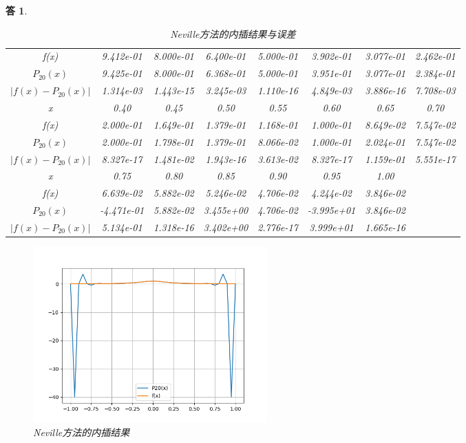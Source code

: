 \documentclass[10pt]{ctexart}
\newtheorem*{answer}{答}
\begin{document}
\begin{answer}
\begin{table}[H]
\begin{tabular}{cccccccc}
            \midrule
            f(x) &  9.412e-01 & 8.000e-01  & 6.400e-01 & 5.000e-01 & 3.902e-01 & 3.077e-01 & 2.462e-01 \\
            $P_{20}(x)$ &  9.425e-01 & 8.000e-01& 6.368e-01 & 5.000e-01 & 3.951e-01 & 3.077e-01 & 2.384e-01 \\
            $\lvert f(x)-P_{20}(x)\rvert$ & 1.314e-03 & 1.443e-15& 3.245e-03 & 1.110e-16 & 4.849e-03 & 3.886e-16 &  7.708e-03\\
            \bottomrule
            \toprule
            x & 0.40 & 0.45 & 0.50 & 0.55 & 0.60 & 0.65 & 0.70 \\
            \midrule
            f(x) &  2.000e-01 & 1.649e-01  & 1.379e-01& 1.168e-01  &  1.000e-01 &8.649e-02 &7.547e-02\\
            $P_{20}(x)$ &  2.000e-01 & 1.798e-01 & 1.379e-01 & 8.066e-02& 1.000e-01 & 2.024e-01& 7.547e-02 \\
            $\lvert f(x)-P_{20}(x)\rvert$ & 8.327e-17& 1.481e-02& 1.943e-16 & 3.613e-02& 8.327e-17 & 1.159e-01 & 5.551e-17\\
            \bottomrule
            \toprule
            x & 0.75 & 0.80 & 0.85 & 0.90 & 0.95 & 1.00\\
            \midrule
            f(x) &  6.639e-02 & 5.882e-02  & 5.246e-02&  4.706e-02  &  4.244e-02 &3.846e-02&\\
            $P_{20}(x)$ &  -4.471e-01 & 5.882e-02 & 3.455e+00&4.706e-02& -3.995e+01 & 3.846e-02 &\\
            $\lvert f(x)-P_{20}(x)\rvert$ & 5.134e-01&  1.318e-16& 3.402e+00 & 2.776e-17& 3.999e+01 & 1.665e-16&\\
            \bottomrule
        \end{tabular}
        \caption{Neville方法的内插结果与误差}
    \end{table}
    \begin{figure}[H]
        \centering
        \includegraphics[width=9cm]{Neville.png}
        \caption{Neville方法的内插结果}
    \end{figure}
\end{answer}
\end{document}
